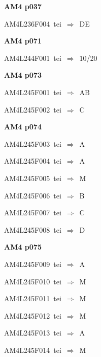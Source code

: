 \par\vfill\eject
{\bf\hfill AM4 p037\hfill\hbox{}}\par\bigskip
{\sixrm AM4L236F004\ {\sixit tei}\ }$\Rightarrow$\ DE\par\smallskip

\par\vfill\eject
{\bf\hfill AM4 p071\hfill\hbox{}}\par\bigskip
{\sixrm AM4L244F001\ {\sixit tei}\ }$\Rightarrow$\ 10/20\par\smallskip

\par\vfill\eject
{\bf\hfill AM4 p073\hfill\hbox{}}\par\bigskip
{\sixrm AM4L245F001\ {\sixit tei}\ }$\Rightarrow$\ AB\par\smallskip
{\sixrm AM4L245F002\ {\sixit tei}\ }$\Rightarrow$\ C\par\smallskip

\par\vfill\eject
{\bf\hfill AM4 p074\hfill\hbox{}}\par\bigskip
{\sixrm AM4L245F003\ {\sixit tei}\ }$\Rightarrow$\ A\par\smallskip
{\sixrm AM4L245F004\ {\sixit tei}\ }$\Rightarrow$\ A\par\smallskip
{\sixrm AM4L245F005\ {\sixit tei}\ }$\Rightarrow$\ M\par\smallskip
{\sixrm AM4L245F006\ {\sixit tei}\ }$\Rightarrow$\ B\par\smallskip
{\sixrm AM4L245F007\ {\sixit tei}\ }$\Rightarrow$\ C\par\smallskip
{\sixrm AM4L245F008\ {\sixit tei}\ }$\Rightarrow$\ D\par\smallskip

\par\vfill\eject
{\bf\hfill AM4 p075\hfill\hbox{}}\par\bigskip
{\sixrm AM4L245F009\ {\sixit tei}\ }$\Rightarrow$\ A\par\smallskip
{\sixrm AM4L245F010\ {\sixit tei}\ }$\Rightarrow$\ M\par\smallskip
{\sixrm AM4L245F011\ {\sixit tei}\ }$\Rightarrow$\ M\par\smallskip
{\sixrm AM4L245F012\ {\sixit tei}\ }$\Rightarrow$\ M\par\smallskip
{\sixrm AM4L245F013\ {\sixit tei}\ }$\Rightarrow$\ A\par\smallskip
{\sixrm AM4L245F014\ {\sixit tei}\ }$\Rightarrow$\ M\par\smallskip

